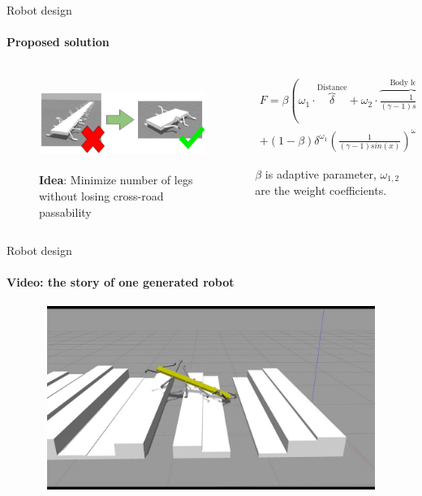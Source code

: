 \documentclass[aspectratio=169]{beamer}
\begin{document}
\begin{frame}[t]{Robot design}
    \framesubtitle{Proposed solution}
    \begin{columns}[T,onlytextwidth]
        \begin{column}{0.49\textwidth}
            \begin{figure}[H]
                \centering\includegraphics[height=3cm,width=1\textwidth,keepaspectratio]{optimization_idea.png}
                \caption*{\textbf{Idea}: Minimize number of legs without losing cross-road passability}
                \label{fig{optimization_idea.png}}
            \end{figure}
        \end{column}
        \begin{column}{0.49\textwidth}
            \begin{eqnarray*}
                F = \beta \left( {\omega}_{1} \cdot \overbrace{\delta}^{\text{Distance}} + {\omega}_{2} \cdot \overbrace{\frac{1}{(\gamma - 1) sin(x)}}^{\text{Body length}}\right) +\\ \nonumber + (1 - \beta) {\delta}^{{\omega}_{1}} {\left( \frac{1}{(\gamma - 1) sin(x)}\right)}^{{\omega}_{2}}
            \end{eqnarray*}
            \vspace{1pt}

            $\beta$ is adaptive parameter, ${\omega}_{1,2}$ are the weight coefficients.
        \end{column}
    \end{columns}
\end{frame}

\begin{frame}[t]{Robot design}
    \framesubtitle{Video: the story of one generated robot}
    \vspace{-0.6cm}
    \begin{figure}[H]
        \href{run:./videos/pass_rand_terr.mp4}{
            \centering\includegraphics[height=6cm,width=1\textwidth,keepaspectratio]{genetic_video_preview.jpg}}
    \end{figure}
\end{frame}
\end{document}
